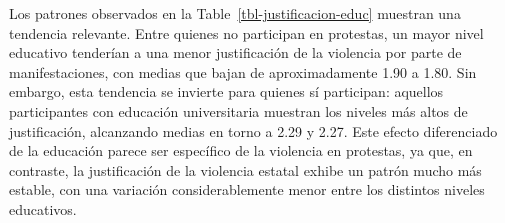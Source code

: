 \documentclass[
  13pt,
]{article}
\begin{document}
Los patrones observados en la Table~\ref{tbl-justificacion-educ}
muestran una tendencia relevante. Entre quienes no participan en
protestas, un mayor nivel educativo tenderían a una menor justificación
de la violencia por parte de manifestaciones, con medias que bajan de
aproximadamente 1.90 a 1.80. Sin embargo, esta tendencia se invierte
para quienes sí participan: aquellos participantes con educación
universitaria muestran los niveles más altos de justificación,
alcanzando medias en torno a 2.29 y 2.27. Este efecto diferenciado de la
educación parece ser específico de la violencia en protestas, ya que, en
contraste, la justificación de la violencia estatal exhibe un patrón
mucho más estable, con una variación considerablemente menor entre los
distintos niveles educativos.

\begin{table}

\caption{\label{tbl-justificacion-educ}Justificación de violencia según
nivel educativo y participación en protestas}

\centering{

\centering\begingroup\fontsize{9}{11}\selectfont

}
\end{table}
\end{document}
